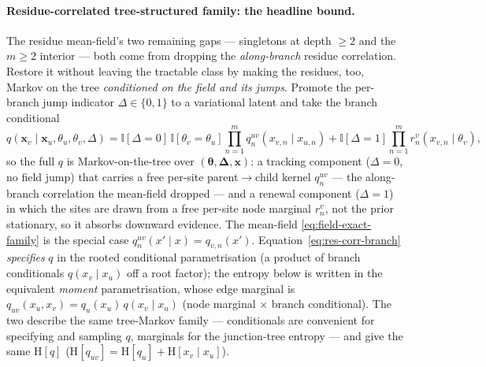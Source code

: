 \paragraph{Residue-correlated tree-structured family: the headline
bound.} The residue mean-field's two remaining gaps --- singletons at
depth ${\ge}2$ and the $m\ge2$ interior --- both come from dropping the
\emph{along-branch} residue correlation. Restore it without leaving the
tractable class by making the residues, too, Markov on the tree
\emph{conditioned on the field and its jumps}. Promote the per-branch jump
indicator $\Delta\in\{0,1\}$ to a variational latent and take the branch
conditional
\begin{equation}
  q(\mathbf{x}_v\mid\mathbf{x}_u,\theta_u,\theta_v,\Delta)
    = \mathbb{I}[\Delta{=}0]\,\mathbb{I}[\theta_v{=}\theta_u]
        \prod_{n=1}^{m} q_{n}^{uv}(x_{v,n}\mid x_{u,n})
    + \mathbb{I}[\Delta{=}1]\prod_{n=1}^{m} r_{n}^{v}(x_{v,n}\mid\theta_v),
  \label{eq:res-corr-branch}
\end{equation}
so the full $q$ is Markov-on-the-tree over $(\boldsymbol\theta,\boldsymbol\Delta,
\mathbf{x})$: a tracking component ($\Delta{=}0$, no field jump) that carries a
free per-site parent$\to$child kernel $q_n^{uv}$ --- the along-branch
correlation the mean-field dropped --- and a renewal component ($\Delta{=}1$)
in which the sites are drawn from a free per-site node marginal $r_n^v$, not
the prior stationary, so it absorbs downward evidence. The mean-field
\eqref{eq:field-exact-family} is the special case $q_n^{uv}(x'\mid x)=q_{v,n}(x')$.
Equation~\eqref{eq:res-corr-branch} \emph{specifies} $q$ in the rooted
conditional parametrisation (a product of branch conditionals $q(x_v\mid x_u)$
off a root factor); the entropy below is written in the equivalent
\emph{moment} parametrisation, whose edge marginal is
$q_{uv}(x_u,x_v)=q_u(x_u)\,q(x_v\mid x_u)$ (node marginal $\times$ branch
conditional). The two describe the same tree-Markov family --- conditionals are
convenient for specifying and sampling $q$, marginals for the junction-tree
entropy --- and give the same $\mathrm{H}[q]$
($\mathrm{H}[q_{uv}]=\mathrm{H}[q_u]+\mathrm{H}[x_v\mid x_u]$).

